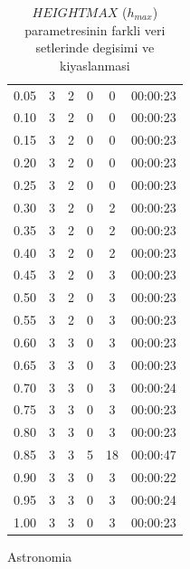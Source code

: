 \documentclass[review]{elsarticle}
\begin{document}
\begin{table}[H]
\begin{subtable}[h]{0.45\textwidth}
{\begin{tabular}{@{}cccccc@{}}
                        0.05 & 3 & 2 & 0 & 0 & 00:00:23 \\
                        \rowcolor{LightCyan}
                        0.10 & 3 & 2 & 0 & 0 & 00:00:23 \\
                        0.15 & 3 & 2 & 0 & 0 & 00:00:23 \\
                        0.20 & 3 & 2 & 0 & 0 & 00:00:23 \\
                        0.25 & 3 & 2 & 0 & 0 & 00:00:23 \\
                        0.30 & 3 & 2 & 0 & 2 & 00:00:23 \\
                        0.35 & 3 & 2 & 0 & 2 & 00:00:23 \\
                        0.40 & 3 & 2 & 0 & 2 & 00:00:23 \\
                        0.45 & 3 & 2 & 0 & 3 & 00:00:23 \\
                        0.50 & 3 & 2 & 0 & 3 & 00:00:23 \\
                        0.55 & 3 & 2 & 0 & 3 & 00:00:23 \\
                        0.60 & 3 & 3 & 0 & 3 & 00:00:23 \\
                        0.65 & 3 & 3 & 0 & 3 & 00:00:23 \\
                        0.70 & 3 & 3 & 0 & 3 & 00:00:24 \\
                        0.75 & 3 & 3 & 0 & 3 & 00:00:23 \\
                        0.80 & 3 & 3 & 0 & 3 & 00:00:23 \\
                        0.85 & 3 & 3 & 5 & 18 & 00:00:47 \\
                        0.90 & 3 & 3 & 0 & 3 & 00:00:22 \\
                        0.95 & 3 & 3 & 0 & 3 & 00:00:24 \\
                        1.00 & 3 & 3 & 0 & 3 & 00:00:23 \\
        \end{tabular}
        }
        \caption{Astronomia}
        \label{tab:astronomia_hmax}
    \end{subtable}
    \caption{$HEIGHTMAX$ ($h_{max}$) parametresinin farkli veri setlerinde degisimi ve kiyaslanmasi}
    \label{tab:heightmax}
\end{table}
\end{document}
